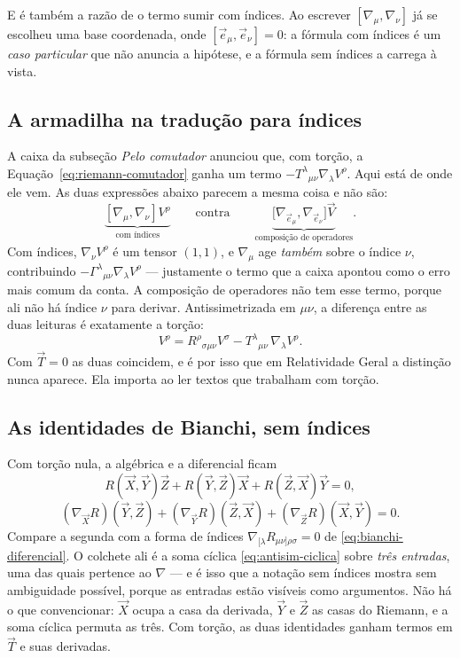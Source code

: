 \documentclass[12pt,a4paper,oneside]{book}
\theoremstyle{rgplain}
\theoremstyle{rgremark}
\begin{document}
E é também a razão de o termo sumir com índices. Ao escrever
$[\nabla_\mu,\nabla_\nu]$ já se escolheu uma base coordenada, onde
$[\vec e_\mu,\vec e_\nu]=0$: a fórmula com índices é um \emph{caso particular}
que não anuncia a hipótese, e a fórmula sem índices a carrega à vista.

\subsection*{A armadilha na tradução para índices}

A caixa da subseção \emph{Pelo comutador} anunciou que, com torção, a
Equação~\eqref{eq:riemann-comutador} ganha um termo
$-T^\lambda{}_{\mu\nu}\nabla_\lambda V^\rho$. Aqui está de onde ele vem. As
duas expressões abaixo parecem a mesma coisa e não são:
\[
  \underbrace{[\nabla_\mu,\nabla_\nu]V^\rho}_{\text{com índices}}
  \qquad\text{contra}\qquad
  \underbrace{\bigl[\nabla_{\vec e_\mu},\nabla_{\vec e_\nu}\bigr]\vec V}
             _{\text{composição de operadores}} .
\]
Com índices, $\nabla_\nu V^\rho$ é um tensor $(1,1)$, e $\nabla_\mu$ age
\emph{também} sobre o índice $\nu$, contribuindo $-\Gamma^\lambda{}_{\mu\nu}
\nabla_\lambda V^\rho$ --- justamente o termo que a caixa apontou como o erro
mais comum da conta. A composição de operadores não tem esse termo, porque ali
não há índice $\nu$ para derivar. Antissimetrizada em $\mu\nu$, a diferença
entre as duas leituras é exatamente a torção:
\begin{equation}
  [\nabla_\mu,\nabla_\nu]V^\rho
  =R^\rho{}_{\sigma\mu\nu}V^\sigma
   -T^\lambda{}_{\mu\nu}\,\nabla_\lambda V^\rho .
  \label{eq:ponte-indices}
\end{equation}
Com $\vec T=0$ as duas coincidem, e é por isso que em Relatividade Geral a
distinção nunca aparece. Ela importa ao ler textos que trabalham com torção.

\subsection*{As identidades de Bianchi, sem índices}

Com torção nula, a algébrica e a diferencial ficam
\[
  R(\vec X,\vec Y)\vec Z+R(\vec Y,\vec Z)\vec X+R(\vec Z,\vec X)\vec Y=0 ,
\]
\[
  (\nabla_{\vec X}R)(\vec Y,\vec Z)
 +(\nabla_{\vec Y}R)(\vec Z,\vec X)
 +(\nabla_{\vec Z}R)(\vec X,\vec Y)=0 .
\]
Compare a segunda com a forma de índices
$\nabla_{[\lambda}R_{\mu\nu]\rho\sigma}=0$ de
\eqref{eq:bianchi-diferencial}. O colchete ali é a soma cíclica
\eqref{eq:antisim-ciclica} sobre \emph{três entradas}, uma das quais pertence
ao $\nabla$ --- e é isso que a notação sem índices mostra sem ambiguidade
possível, porque as entradas estão visíveis como argumentos. Não há o que
convencionar: $\vec X$ ocupa a casa da derivada, $\vec Y$ e $\vec Z$ as casas
do Riemann, e a soma cíclica permuta as três. Com torção, as duas identidades
ganham termos em $\vec T$ e suas derivadas.
\end{document}
